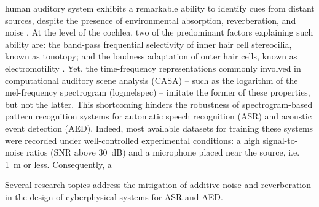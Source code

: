 \documentclass[journal]{IEEEtran}
\makeatletter
\newcommand*{\ie}{i.e.\@\xspace}
\makeatother
\begin{document}
 human auditory system exhibits a remarkable ability to identify cues from distant sources, despite the presence of environmental absorption, reverberation, and noise \cite{meyer2013plos}.
At the level of the cochlea, two of the predominant factors explaining such ability are:
the band-pass frequential selectivity of inner hair cell stereocilia, known as tonotopy;
and the loudness adaptation of outer hair cells, known as electromotility \cite{robles2001physiolrev}.
Yet, the time-frequency representations commonly involved in computational auditory scene analysis (CASA) -- such as the logarithm of the mel-frequency spectrogram (logmelspec) -- imitate the former of these properties, but not the latter.
This shortcoming hinders the robustness of spectrogram-based pattern recognition systems for automatic speech recognition (ASR) and acoustic event detection (AED).
Indeed, most available datasets for training these systems were recorded under well-controlled experimental conditions: a high signal-to-noise ratios (SNR above \SI{30}{\deci\bel}) and a microphone placed near the source, \ie{} \SI{1}{m} or less. %
Consequently, a

Several research topics address the mitigation of additive noise and reverberation in the design of cyberphysical systems for ASR and AED.





\end{document}
